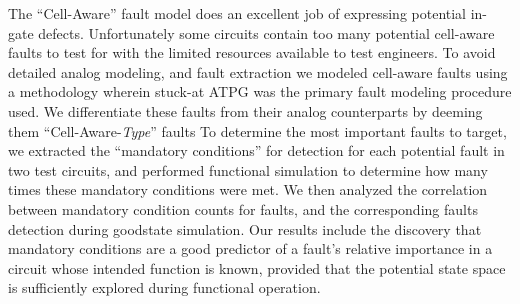     \begin{comment}

    This paper outlines our current progress in the search for intelligent targeting methods for a class of faults known as ``Cell-Aware Type Faults''. We begin with a brief introduction to cell-aware faults and a description of how they differ from the cell-aware type faults that we are examining in this endeavor. We then describe our over-arching research goal: To find an attribute that can predict whether or not cell-aware faults can cause serious problems during functional usage. We then present our research methodology beginning with the generation of a describing-fault-model for cell-aware type faults, and an analysis of potential attributes that can be used to classify and characterize cell-aware type faults. Our findings are discussed, and the respective benefits to manufacturing test are discussed.


    \end{comment}

    The ``Cell-Aware'' fault model does an excellent job of expressing potential in-gate defects. Unfortunately some circuits contain too many potential cell-aware faults to test for with the limited resources available to test engineers. To avoid detailed analog modeling, and fault extraction we modeled cell-aware faults using a methodology wherein stuck-at ATPG was the primary fault modeling procedure used.  We differentiate these faults from their analog counterparts by deeming them ``Cell-Aware-\textit{Type}'' faults
    To determine the most important faults to target, we extracted the ``mandatory conditions'' for detection for each potential fault in two test circuits, and performed functional simulation to determine how many times these mandatory conditions were met.
    We then analyzed the correlation between mandatory condition counts for faults, and the corresponding faults detection during goodstate simulation. 
    Our results include the discovery that mandatory conditions are a good predictor of a fault's relative importance in a circuit whose intended function is known, provided that the potential state space is sufficiently explored during functional operation. 